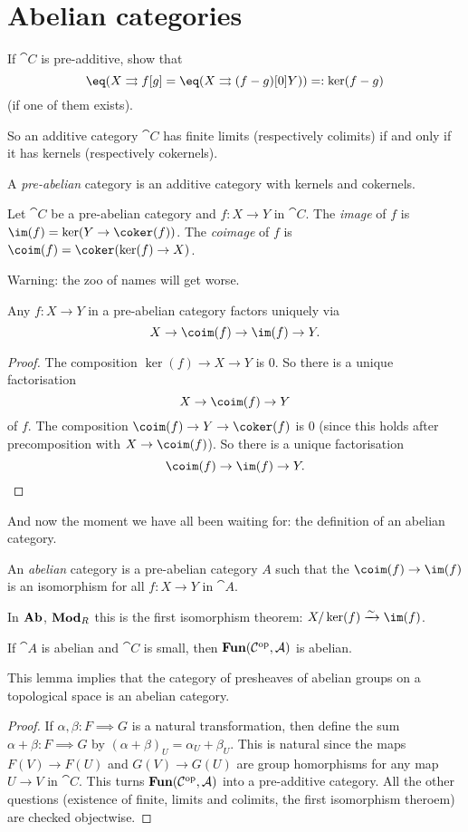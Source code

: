 \documentclass[../main.tex]{subfiles}
\begin{document}
\section{Abelian categories}
\begin{exc}
	If $\cat C$ is pre-additive, show that \[
    	\eq(X \rightrightarrows{f}[g] = \eq(X \rightrightarrows{(f-g)}[0] Y)) =: \ker(f-g)
    \] (if one of them exists).
\end{exc}
So an additive category $\cat C$ has finite limits (respectively colimits) if and only if it has kernels (respectively cokernels).
\begin{defn}
	A \emph{pre-abelian} category is an additive category with kernels and cokernels.
\end{defn}
\begin{defn}
	Let $\cat C$ be a pre-abelian category and $f: X \to Y$ in $\cat C$. The \emph{image} of $f$ is $\im(f) = \ker(Y \to \coker(f))$. The \emph{coimage} of $f$ is $\coim(f) = \coker(\ker(f) \to X)$.
\end{defn}
Warning: the zoo of names will get worse.
\begin{lem}
	Any $f: X \to Y$ in a pre-abelian category factors uniquely via \[
    	X \to \coim(f) \to \im(f) \to Y.
    \]
\end{lem}
\begin{proof}
	The composition $\ker(f) \to X \to Y$ is $0$. So there is a unique factorisation \[
    	X \to \coim(f) \to Y
    \] of $f$. The composition $\coim(f) \to Y \to \coker(f)$ is $0$ (since this holds after precomposition with $X \to \coim(f)$). So there is a unique factorisation \[
    	\coim(f) \to \im(f) \to Y.
    \]
\end{proof}
And now the moment we have all been waiting for: the definition of an abelian category.

\begin{defn}
	An \emph{abelian} category is a pre-abelian category $A$ such that the $\coim(f) \to \im(f)$ is an isomorphism for all $f: X \to Y$ in $\cat A$.
\end{defn}
\begin{exmp}
	In $\mathbf{Ab}$, $\catModule_R$ this is the first isomorphism theorem: $X/\ker(f) \xrightarrow{\sim} \im(f)$.
\end{exmp}
\begin{lem}
	If $\cat A$ is abelian and $\cat C$ is small, then $\operatorname{\mathbf{Fun}}(\mathcal{C}^{\mathrm{op}}, \mathcal{A})$ is abelian.
\end{lem}
This lemma implies that the category of presheaves of abelian groups on a topological space is an abelian category.

\begin{proof}
	If $\alpha, \beta: F \implies G$ is a natural transformation, then define the sum $\alpha + \beta: F \implies G$ by $(\alpha + \beta)_U = \alpha_U + \beta_U$. This is natural since the maps $F(V) \to F(U)$ and $G(V) \to G(U)$ are group homorphisms for any map $U \to V$ in $\cat C$. This turns $\operatorname{\mathbf{Fun}}(\mathcal{C}^{\mathrm{op}}, \mathcal{A})$ into a pre-additive category. All the other questions (existence of finite, limits and colimits, the first isomorphism theroem) are checked objectwise.
\end{proof}
\end{document}
